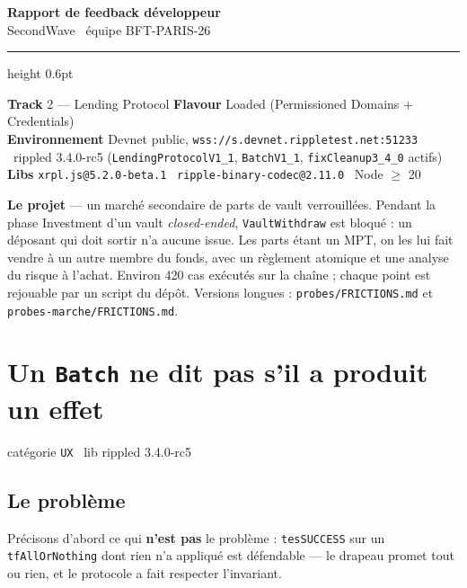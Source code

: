 \documentclass[10pt,a4paper]{article}
\newcommand{\cat}[2]{{\small\textsf{catégorie} \texttt{#1} \textperiodcentered\ \textsf{lib} #2}\par\vspace{2pt}}
\newcommand{\tc}[1]{\texttt{#1}}
\begin{document}
\begin{center}
{\LARGE\bfseries Rapport de feedback développeur}\\[2pt]
{\large SecondWave \textperiodcentered\ équipe BFT-PARIS-26}
\end{center}
\vspace{2pt}
{\color{rule}\hrule height 0.6pt}
\vspace{5pt}

{\small
\textbf{Track} 2 --- Lending Protocol \quad \textbf{Flavour} Loaded (Permissioned Domains + Credentials)\\
\textbf{Environnement} Devnet public, \tc{wss://s.devnet.rippletest.net:51233} \textperiodcentered\ rippled 3.4.0-rc5
(\tc{LendingProtocolV1\_1}, \tc{BatchV1\_1}, \tc{fixCleanup3\_4\_0} actifs)\\
\textbf{Libs} \tc{xrpl.js@5.2.0-beta.1} \textperiodcentered\ \tc{ripple-binary-codec@2.11.0} \textperiodcentered\ Node $\geq$ 20
\par}
\vspace{4pt}

\textbf{Le projet} --- un marché secondaire de parts de vault verrouillées. Pendant la phase
Investment d'un vault \emph{closed-ended}, \tc{VaultWithdraw} est bloqué : un déposant qui doit
sortir n'a aucune issue. Les parts étant un MPT, on les lui fait vendre à un autre membre du
fonds, avec un règlement atomique et une analyse du risque à l'achat. Environ 420 cas exécutés
sur la chaîne ; chaque point est rejouable par un script du dépôt. Versions longues :
\tc{probes/FRICTIONS.md} et \tc{probes-marche/FRICTIONS.md}.

\section{Un \texttt{Batch} ne dit pas s'il a produit un effet}
\cat{UX}{rippled 3.4.0-rc5}

\subsection{Le problème}
Précisons d'abord ce qui \textbf{n'est pas} le problème : \tc{tesSUCCESS} sur un
\tc{tfAllOrNothing} dont rien n'a appliqué est défendable --- le drapeau promet \og tout ou
rien\fg{}, et le protocole a fait respecter l'invariant.
\end{document}
